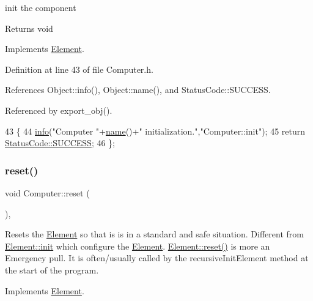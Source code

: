 init the component

\begin{DoxyReturn}{Returns}
void 
\end{DoxyReturn}


Implements \hyperlink{classElement_af42754b5cabc198869222725218d695c}{Element}.



Definition at line 43 of file Computer.\+h.



References Object\+::info(), Object\+::name(), and Status\+Code\+::\+S\+U\+C\+C\+E\+SS.



Referenced by export\+\_\+obj().


\begin{DoxyCode}
43                     \{
44     \hyperlink{classObject_a644fd329ea4cb85f54fa6846484b84a8}{info}(\textcolor{stringliteral}{"Computer "}+\hyperlink{classObject_a300f4c05dd468c7bb8b3c968868443c1}{name}()+\textcolor{stringliteral}{" initialization."},\textcolor{stringliteral}{"Computer::init"});
45     \textcolor{keywordflow}{return} \hyperlink{classStatusCode_a6f565cbeadc76d14c72f047e5e85eb4badd0da38d3ba0d922efd1f4619bc37ad8}{StatusCode::SUCCESS};
46   \};
\end{DoxyCode}
\mbox{\label{classComputer_aeab90cbacbef385685717c249a07929d}} 
\subsubsection{\texorpdfstring{reset()}{reset()}}
{\footnotesize\ttfamily void Computer\+::reset (\begin{DoxyParamCaption}{ }\end{DoxyParamCaption})\hspace{0.3cm}{\ttfamily [inline]}, {\ttfamily [virtual]}}

Resets the \hyperlink{classElement}{Element} so that is is in a standard and safe situation. Different from \hyperlink{classElement_af42754b5cabc198869222725218d695c}{Element\+::init} which configure the \hyperlink{classElement}{Element}. \hyperlink{classElement_a69efffa22f06909d768149715565cb56}{Element\+::reset()} is more an Emergency pull. It is often/usually called by the recursive\+Init\+Element method at the start of the program. 

Implements \hyperlink{classElement_a69efffa22f06909d768149715565cb56}{Element}.



